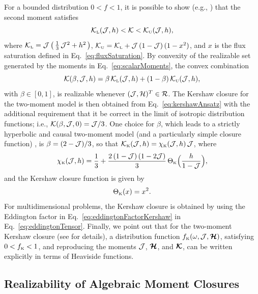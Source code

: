 For a bounded distribution $0<f<1$, it is possible to show (e.g., \cite{banachLarecki_2013}) that the second moment satisfies
\begin{equation}
  \mathcal{K}_{\mbox{\tiny L}}(\mathcal{J},h) < \mathcal{K} < \mathcal{K}_{\mbox{\tiny U}}(\mathcal{J},h),
\end{equation}
where $\mathcal{K}_{\mbox{\tiny L}}=\mathcal{J}\,\big(\,\frac{1}{3}\,\mathcal{J}^{2}+h^{2}\,\big)$, $\mathcal{K}_{\mbox{\tiny U}}=\mathcal{K}_{\mbox{\tiny L}} + \mathcal{J}\,(1-\mathcal{J})\,(1-x^{2})$, and $x$ is the flux saturation defined in Eq.~\eqref{eq:fluxSaturation}.  
By convexity of the realizable set generated by the moments in Eq.~\eqref{eq:scalarMoments}, the convex combination
\begin{equation}
  \mathcal{K}(\beta,\mathcal{J},h)=\beta\,\mathcal{K}_{\mbox{\tiny L}}(\mathcal{J},h)+(1-\beta)\,\mathcal{K}_{\mbox{\tiny U}}(\mathcal{J},h),
  \label{eq:kershawAnsatz}
\end{equation}
with $\beta\in[0,1]$, is realizable whenever $(\mathcal{J},\mathcal{H})^{T}\in\mathcal{R}$.  
The Kershaw closure for the two-moment model is then obtained from Eq.~\eqref{eq:kershawAnsatz} with the additional requirement that it be correct in the limit of isotropic distribution functions; i.e., $\mathcal{K}(\beta,\mathcal{J},0)=\mathcal{J}/3$.  
One choice for $\beta$, which leads to a strictly hyperbolic and causal two-moment model (and a particularly simple closure function) \cite{banachLarecki_2017a}, is $\beta=(2-\mathcal{J})/3$, so that $\mathcal{K}_{\mbox{\tiny K}}(\mathcal{J},h)=\chi_{\mbox{\tiny K}}(\mathcal{J},h)\,\mathcal{J}$, where
\begin{equation}
  \chi_{\mbox{\tiny K}}(\mathcal{J},h)=\frac{1}{3}+\frac{2\,(1-\mathcal{J})\,(1-2\mathcal{J})}{3}\,\Theta_{\mbox{\tiny K}}\Big(\frac{h}{1-\mathcal{J}}\Big),
  \label{eq:eddingtonFactorKershaw}
\end{equation}
and the Kershaw closure function is given by
\begin{equation}
  \Theta_{\mbox{\tiny K}}(x)=x^{2}.  
\end{equation}
For multidimensional problems, the Kershaw closure is obtained by using the Eddington factor in Eq.~\eqref{eq:eddingtonFactorKershaw} in Eq.~\eqref{eq:eddingtonTensor}.  
Finally, we point out that for the two-moment Kershaw closure (see \cite{banachLarecki_2017a} for details), a distribution function $f_{\mbox{\tiny K}}(\omega,\mathcal{J},\boldsymbol{\mathcal{H}})$, satisfying $0 < f_{\mbox{\tiny K}} < 1$, and reproducing the moments $\mathcal{J}$, $\boldsymbol{\mathcal{H}}$, and $\boldsymbol{\mathcal{K}}$, can be written explicitly in terms of Heaviside functions.  

\subsection{Realizability of Algebraic Moment Closures}

